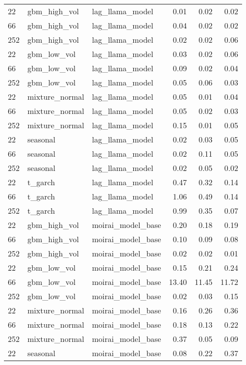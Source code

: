 {\begin{tabular}{lllrrr}
\midrule
22 & gbm\_high\_vol & lag\_llama\_model & 0.01 & 0.02 & 0.02 \\
66 & gbm\_high\_vol & lag\_llama\_model & 0.04 & 0.02 & 0.02 \\
252 & gbm\_high\_vol & lag\_llama\_model & 0.02 & 0.02 & 0.06 \\
\midrule
22 & gbm\_low\_vol & lag\_llama\_model & 0.03 & 0.02 & 0.06 \\
66 & gbm\_low\_vol & lag\_llama\_model & 0.09 & 0.02 & 0.04 \\
252 & gbm\_low\_vol & lag\_llama\_model & 0.05 & 0.06 & 0.03 \\
\midrule
22 & mixture\_normal & lag\_llama\_model & 0.05 & 0.01 & 0.04 \\
66 & mixture\_normal & lag\_llama\_model & 0.05 & 0.02 & 0.03 \\
252 & mixture\_normal & lag\_llama\_model & 0.15 & 0.01 & 0.05 \\
\midrule
22 & seasonal & lag\_llama\_model & 0.02 & 0.03 & 0.05 \\
66 & seasonal & lag\_llama\_model & 0.02 & 0.11 & 0.05 \\
252 & seasonal & lag\_llama\_model & 0.02 & 0.05 & 0.02 \\
\midrule
22 & t\_garch & lag\_llama\_model & 0.47 & 0.32 & 0.14 \\
66 & t\_garch & lag\_llama\_model & 1.06 & 0.49 & 0.14 \\
252 & t\_garch & lag\_llama\_model & 0.99 & 0.35 & 0.07 \\
\midrule
22 & gbm\_high\_vol & moirai\_model\_base & 0.20 & 0.18 & 0.19 \\
66 & gbm\_high\_vol & moirai\_model\_base & 0.10 & 0.09 & 0.08 \\
252 & gbm\_high\_vol & moirai\_model\_base & 0.02 & 0.02 & 0.01 \\
\midrule
22 & gbm\_low\_vol & moirai\_model\_base & 0.15 & 0.21 & 0.24 \\
66 & gbm\_low\_vol & moirai\_model\_base & 13.40 & 11.45 & 11.72 \\
252 & gbm\_low\_vol & moirai\_model\_base & 0.02 & 0.03 & 0.15 \\
\midrule
22 & mixture\_normal & moirai\_model\_base & 0.16 & 0.26 & 0.36 \\
66 & mixture\_normal & moirai\_model\_base & 0.18 & 0.13 & 0.22 \\
252 & mixture\_normal & moirai\_model\_base & 0.37 & 0.05 & 0.09 \\
\midrule
22 & seasonal & moirai\_model\_base & 0.08 & 0.22 & 0.37 \\

\end{tabular}}
